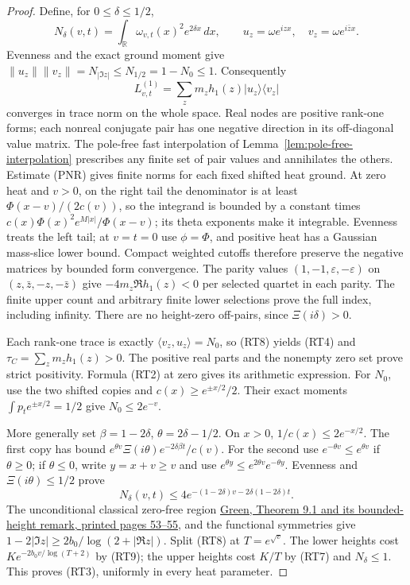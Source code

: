 \documentclass[11pt]{article}
\theoremstyle{remark}\newtheorem{remark}[theorem]{Remark}
\newcommand{\R}{\mathbb R}
\begin{document}
\begin{proof}
Define, for \(0\le\delta\le1/2\),
\[
 N_\delta(v,t)=\int_{\R}\omega_{v,t}(x)^2e^{2\delta x}\,dx,
 \qquad u_z=\omega e^{izx},\quad v_z=\omega e^{i\bar z x}.
\]
Evenness and the exact ground moment give
\(\|u_z\|\|v_z\|=N_{|\Im z|}\le N_{1/2}=1-N_0\le1\).
Consequently
\[
 L^{(1)}_{v,t}=\sum_zm_z h_1(z)|u_z\rangle\langle v_z|
                                                        \tag{RT8}
\]
converges in trace norm on the whole space.
Real nodes are positive rank-one forms; each nonreal conjugate
pair has one negative direction in its off-diagonal value matrix.
The pole-free fast interpolation of
Lemma~\ref{lem:pole-free-interpolation} prescribes any finite
set of pair values and annihilates the others.
Estimate (PNR) gives finite norms for each fixed shifted heat
ground. At zero heat and \(v>0\), on the right tail the
denominator is at least \(\Phi(x-v)/(2c(v))\), so the
integrand is bounded by a constant times
\(c(x)\Phi(x)^2e^{M|x|}/\Phi(x-v)\); its theta
exponents make it integrable. Evenness treats the left tail;
at \(v=t=0\) use \(\phi=\Phi\), and positive heat has a
Gaussian mass-slice lower bound. Compact weighted cutoffs
therefore preserve the negative matrices by bounded form
convergence. The parity values \((1,-1,\varepsilon,-\varepsilon)\)
on \((z,\bar z,-z,-\bar z)\) give
\(-4m_z\Re h_1(z)<0\) per selected quartet in each parity.
The finite upper count and arbitrary finite lower selections
prove the full index, including infinity.
There are no height-zero off-pairs, since \(\Xi(i\delta)>0\).

Each rank-one trace is exactly
\(\langle v_z,u_z\rangle=N_0\), so (RT8) yields (RT4) and
\(\tau_C=\sum_zm_zh_1(z)>0\).
The positive real parts and the nonempty zero set prove strict
positivity. Formula (RT2) at zero gives its arithmetic expression.
For \(N_0\), use the two shifted copies and
\(c(x)\ge e^{\pm x/2}/2\). Their exact moments
\(\int p_t e^{\pm x/2}=1/2\) give \(N_0\le2e^{-v}\).

More generally set \(\beta=1-2\delta\), \(\theta=2\delta-1/2\).
On \(x>0\), \(1/c(x)\le2e^{-x/2}\).
The first copy has bound
\(e^{\theta v}\Xi(i\theta)e^{-2\delta\beta t}/c(v)\).
For the second use \(e^{-\theta v}\le e^{\theta v}\) if
\(\theta\ge0\); if \(\theta\le0\), write \(y=x+v\ge v\)
and use \(e^{\theta y}\le e^{2\theta v}e^{-\theta y}\).
Evenness and \(\Xi(i\theta)\le1/2\) prove
\[
 N_\delta(v,t)\le4e^{-(1-2\delta)v-2\delta(1-2\delta)t}.
                                                        \tag{RT9}
\]
The unconditional classical zero-free region
\href{https://people.maths.ox.ac.uk/greenbj/papers/primenumbers.pdf}
{Green, Theorem 9.1 and its bounded-height remark, printed
pages 53--55}, and the functional symmetries give
\(1-2|\Im z|\ge2b_0/\log(2+|\Re z|)\).
Split (RT8) at \(T=e^{\sqrt v}\).
The lower heights cost \(Ke^{-2b_0v/\log(T+2)}\) by (RT9);
the upper heights cost \(K/T\) by (RT7) and \(N_\delta\le1\).
This proves (RT3), uniformly in every heat parameter.
\end{proof}
\end{document}
